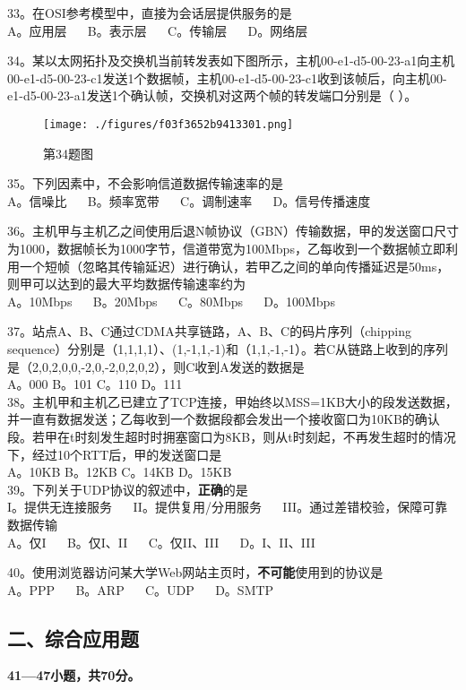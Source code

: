 33。在OSI参考模型中，直接为会话层提供服务的是 \\
A。应用层 $\quad$ B。表示层  $\quad$ C。传输层 $\quad$ D。网络层

34。某以太网拓扑及交换机当前转发表如下图所示，主机00-e1-d5-00-23-a1向主机00-e1-d5-00-23-c1发送1个数据帧，主机00-e1-d5-00-23-c1收到该帧后，向主机00-e1-d5-00-23-a1发送1个确认帧，交换机对这两个帧的转发端口分别是（ ）。
\begin{figure}[ht]
\centering
\texttt{[image: ./figures/f03f3652b9413301.png]}
\caption{第34题图} \label{fig_CSN14_3}
\end{figure}

35。下列因素中，不会影响信道数据传输速率的是 \\
A。信噪比 $\quad$ B。频率宽带 $\quad$ C。调制速率 $\quad$ D。信号传播速度

36。主机甲与主机乙之间使用后退N帧协议（GBN）传输数据，甲的发送窗口尺寸为1000，数据帧长为1000字节，信道带宽为100Mbps，乙每收到一个数据帧立即利用一个短帧（忽略其传输延迟）进行确认，若甲乙之间的单向传播延迟是50ms，则甲可以达到的最大平均数据传输速率约为 \\
A。10Mbps $\quad$ B。20Mbps $\quad$ C。80Mbps $\quad$ D。100Mbps

37。站点A、B、C通过CDMA共享链路，A、B、C的码片序列（chipping sequence）分别是（1,1,1,1）、(1,-1,1,-1)和（1,1,-1,-1）。若C从链路上收到的序列是（2,0,2,0,0,-2,0,-2,0,2,0,2），则C收到A发送的数据是 \\
A。000 B。101 C。110 D。111 \\

38。主机甲和主机乙已建立了TCP连接，甲始终以MSS=1KB大小的段发送数据，并一直有数据发送；乙每收到一个数据段都会发出一个接收窗口为10KB的确认段。若甲在t时刻发生超时时拥塞窗口为8KB，则从t时刻起，不再发生超时的情况下，经过10个RTT后，甲的发送窗口是 \\
A。10KB B。12KB C。14KB D。15KB \\

39。下列关于UDP协议的叙述中，\textbf{正确}的是 \\
I。提供无连接服务 $\quad$ II。提供复用/分用服务 $\quad$ III。通过差错校验，保障可靠数据传输 \\
A。仅I $\quad$ B。仅I、II $\quad$ C。仅II、III $\quad$ D。I、II、III

40。使用浏览器访问某大学Web网站主页时，\textbf{不可能}使用到的协议是 \\
A。PPP $\quad$ B。ARP $\quad$ C。UDP $\quad$ D。SMTP

\subsection{二、综合应用题}
\textbf{41—47小题，共70分。}

